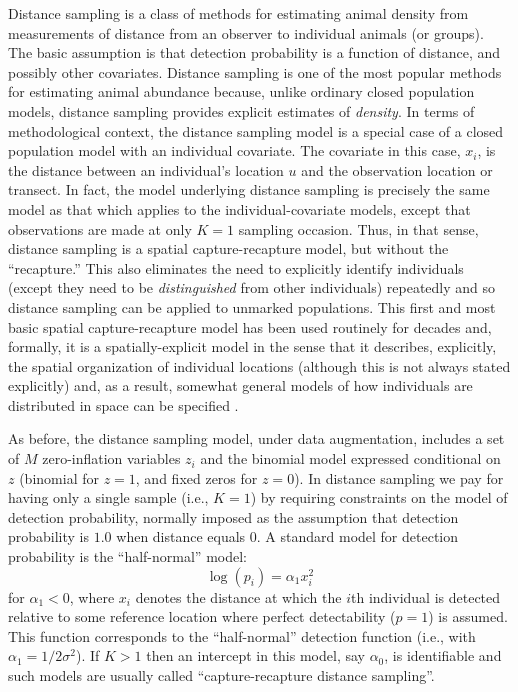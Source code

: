 Distance sampling is a class of methods for estimating animal density
from measurements of distance from an observer to individual animals
(or groups). The basic assumption is that detection probability is
 a function of distance, and possibly other covariates. 
Distance sampling is one of the most popular methods for estimating
animal abundance \citep{burnham_etal:1980, buckland_etal:2001,
  buckland_etal:2004book} because, unlike ordinary closed population models,
distance sampling provides explicit estimates of {\it density}.
 In terms of
methodological context, the distance sampling model is a special case
of a closed population model with an individual covariate. The
covariate in this case, $x_{i}$, is the distance between an
individual's location $u$ and the observation location or transect. In
fact, the model underlying distance sampling is precisely the same
model as that which applies to the individual-covariate models, except
that observations are made at only $K=1$ sampling occasion. Thus, in
that sense, distance sampling is a spatial capture-recapture model,
but without the ``recapture.''  This also eliminates the need to
explicitly identify individuals (except they need to be {\it
  distinguished} from other individuals) repeatedly and so distance
sampling can be applied to unmarked populations. 
This first and most basic spatial
capture-recapture model has been used routinely for decades and,
formally, it is a spatially-explicit model in the sense that it
describes, explicitly, the spatial organization of individual
locations (although this is not always stated explicitly) and, as a
result, somewhat general models of how individuals are distributed in
space can be specified \citep{hedley_etal:1999, royle_etal:2004,
  johnson_etal:2010, niemi_fernandez:2010, sillett_etal:2012}.

As before, the distance sampling model, under data augmentation,
includes a set of $M$ zero-inflation variables $z_{i}$ and the
binomial model expressed conditional on $z$ (binomial for $z=1$, and
fixed zeros for $z=0$).  In distance sampling we pay for having only a
single sample (i.e., $K=1$) by requiring constraints on the model of
detection probability, normally imposed as the assumption that
detection probability is $1.0$ when distance equals 0.  A standard
model for detection probability is the ``half-normal'' model:
\[
\log(p_{i}) = \alpha_{1} x_{i}^{2}
\]
for $\alpha_{1} < 0$, where $x_i$ denotes the distance at which the $i$th
individual is detected relative to some reference location where
perfect detectability ($p=1$) is assumed. This function corresponds to
the ``half-normal'' detection function (i.e., with $\alpha_{1} =
1/2\sigma^{2}$).  If $K>1$ then an intercept in this model, say $\alpha_{0}$, is
identifiable and such models are usually called ``capture-recapture
distance sampling''\citep{alpizar_pollock:1996,borchers_etal:1998}.

